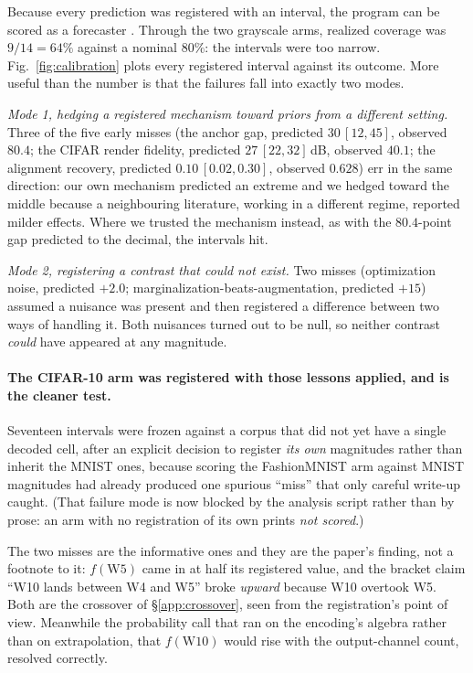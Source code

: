 Because every prediction was registered with an interval, the program can be scored as a
forecaster \citep{gneiting2007scoring}. Through the two grayscale arms, realized coverage was
$9/14 = 64\%$ against a nominal $80\%$: the intervals were too narrow. Fig.~\ref{fig:calibration}
plots every registered interval against its outcome. More useful than the number is that the
failures fall into exactly two modes.

\emph{Mode 1, hedging a registered mechanism toward priors from a different setting.} Three of
the five early misses (the anchor gap, predicted $30\,[12,45]$, observed $80.4$; the CIFAR render
fidelity, predicted $27\,[22,32]$\,dB, observed $40.1$; the alignment recovery, predicted
$0.10\,[0.02,0.30]$, observed $0.628$) err in the same direction: our own mechanism predicted an
extreme and we hedged toward the middle because a neighbouring literature, working in a different
regime, reported milder effects. Where we trusted the mechanism instead, as with the $80.4$-point gap predicted to the decimal, the intervals hit.

\emph{Mode 2, registering a contrast that could not exist.} Two misses (optimization noise,
predicted $+2.0$; marginalization-beats-augmentation, predicted $+15$) assumed a nuisance was
present and then registered a difference between two ways of handling it. Both nuisances turned
out to be null, so neither contrast \emph{could} have appeared at any magnitude.

\paragraph{The CIFAR-10 arm was registered with those lessons applied, and is the cleaner test.}
Seventeen intervals were frozen against a corpus that did not yet have a single decoded cell,
after an explicit decision to register \emph{its own} magnitudes rather than inherit the MNIST ones, because scoring the FashionMNIST arm against MNIST magnitudes had already produced one
spurious ``miss'' that only careful write-up caught. (That failure mode is now blocked by the
analysis script rather than by prose: an arm with no registration of its own prints
\emph{not scored}.) 

The two misses are the informative ones and they are the paper's finding, not a footnote to it:
$f(\mathrm{W5})$ came in at half its registered value, and the bracket claim ``W10 lands between
W4 and W5'' broke \emph{upward} because W10 overtook W5. Both are the crossover of
\S\ref{app:crossover}, seen from the registration's point of view. Meanwhile the probability call
that ran on the encoding's algebra rather than on extrapolation, that $f(\mathrm{W10})$ would rise with the output-channel count, resolved correctly.


